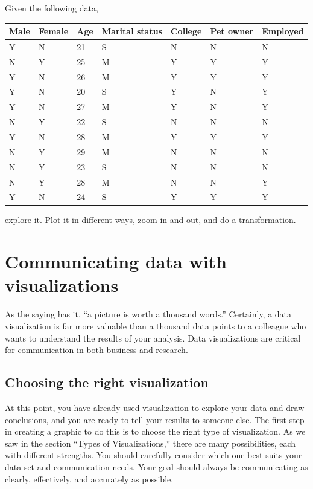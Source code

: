 \begin{problem}
Given the following data, 

\begin{tabular}{| l | l | l | l | l | l | l |}
\hline
Male & Female & Age & Marital status & College & Pet owner & Employed \\
\hline
Y & N & 21 & S &  N & N & N \\
N & Y & 25 & M & Y & Y & Y\\
Y & N & 26 & M & Y & Y & Y\\
Y & N & 20 & S & Y & N & Y\\
Y & N & 27 & M & Y & N & Y\\
N & Y & 22 & S & N & N & N\\
Y & N & 28 & M & Y & Y & Y\\
N & Y & 29 & M &  N & N & N\\
N & Y & 23 & S &  N & N & N\\
N & Y & 28 & M & N & N & Y\\
Y & N &  24 & S & Y & Y & Y\\
\hline
\end{tabular}

explore it. Plot it in different ways, zoom in and out, and do a transformation.
\end{problem}



\section*{Communicating data with visualizations}

As the saying has it, ``a picture is worth a thousand words.'' 
Certainly, a data visualization is far more valuable than a thousand data points to a colleague who wants to understand the results of your analysis. 
Data visualizations are critical for communication in both business and research.

\subsection*{Choosing the right visualization}
At this point, you have already used visualization to explore your data and draw conclusions, and you are ready to tell your results to someone else. 
The first step in creating a graphic to do this is to choose the right type of visualization. 
As we saw in the section ``Types of Visualizations,'' there are many possibilities, each with different strengths. 
You should carefully consider which one best suits your data set and communication needs.  Your goal should always be communicating as clearly, effectively, and accurately as possible.  

